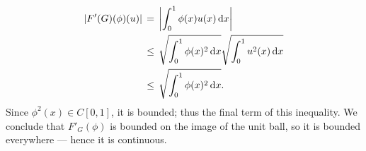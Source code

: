 \documentclass[11pt]{article}
\begin{document}
\begin{align*}
  \abs{F'(G)(\phi)(u)} \, &= \, \abs{\int_{0}^{1} \phi(x)u(x) \dd{x}} \\
                          &\le  \, \sqrt{\int_{0}^{1} \phi(x)^{2} \dd{x}}\sqrt{\int_{0}^{1} u^{2}(x) \dd{x}} \\
                          &\le \, \sqrt{\int_{0}^{1} \phi(x)^{2} \dd{x}}.
\end{align*}
Since $\phi^{2}(x) \in C[0, 1]$, it is bounded; thus the final term of this inequality. We conclude that $F'_{G}(\phi)$ is bounded on the image of the unit ball, so it is bounded everywhere --- hence it is continuous.

\end{document}

